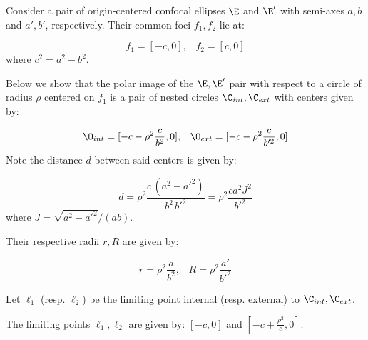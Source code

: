 Consider a pair of origin-centered confocal ellipses $\E$ and $\E'$ with semi-axes $a,b$ and $a',b'$, respectively. Their common foci $f_1,f_2$ lie at:

\[ f_1=[-c,0],\;\;\;f_2=[c,0] \]
where $c^2=a^2-b^2$.

Below we show that the polar image of the $\E,\E'$ pair with respect to a circle of radius $\rho$ centered on $f_1$ is a pair of nested circles $\C_{int},\C_{ext}$ with centers given by:

\[\O_{int}=[-c-\rho^2\frac{c}{b^2},0],\;\;\;\O_{ext}=[-c-\rho^2\frac{c}{b'^2},0]\]
Note the distance $d$ between said centers is given by: 

\[ d=\rho^2\frac{ c\, (a^2 - {a'}^2)}{b^2\, {b'}^2}=\rho^2  \frac{ca^2J^2}{b'^2}\]
where 
$  J = \sqrt{a^2 - a'^2}/(ab).
$

Their respective radii $r,R$ are given by: 

\[ r=\rho^2\frac{a}{b^2},\;\;\;R=\rho^2\frac{a'}{b'^2}\]


 Let $\ell_1$ (resp. $\ell_2$) be the limiting point internal (resp. external) to $\C_{int},\C_{ext}$.
 
 \begin{lemma}
 The limiting points $\ell_1,\ell_2$ are given by: $[-c,0]$ and $[-c+\frac{\rho^2}{c},0]$.
 \end{lemma}
 
 
